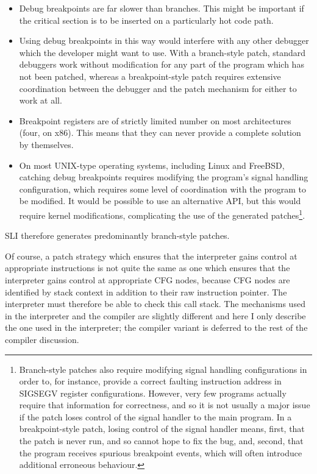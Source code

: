 \begin{itemize}
\item
  Debug breakpoints are far slower than branches.  This might be
  important if the critical section is to be inserted on a
  particularly hot code path.
\item
  Using debug breakpoints in this way would interfere with any other
  debugger which the developer might want to use.  With a branch-style
  patch, standard debuggers work without modification for any part of
  the program which has not been patched, whereas a breakpoint-style
  patch requires extensive coordination between the debugger and the
  patch mechanism for either to work at all.
\item
  Breakpoint registers are of strictly limited number on most
  architectures (four, on x86).  This means that they can never
  provide a complete solution by themselves.
\item
  On most UNIX-type operating systems, including Linux and FreeBSD,
  catching debug breakpoints requires modifying the program's signal
  handling configuration, which requires some level of coordination
  with the program to be modified.  It would be possible to use an
  alternative API, but this would require kernel modifications,
  complicating the use of the generated patches\footnote{Branch-style
    patches also require modifying signal handling configurations in
    order to, for instance, provide a correct faulting instruction
    address in SIGSEGV register configurations.  However, very few
    programs actually require that information for correctness, and so
    it is not usually a major issue if the patch loses control of the
    signal handler to the main program.  In a breakpoint-style patch,
    losing control of the signal handler means, first, that the patch
    is never run, and so cannot hope to fix the bug, and, second, that
    the program receives spurious breakpoint events, which will often
    introduce additional erroneous behaviour.}.
\end{itemize}

SLI therefore generates predominantly branch-style patches.


Of course, a patch strategy which ensures that the interpreter gains
control at appropriate instructions is not quite the same as one which
ensures that the interpreter gains control at appropriate CFG nodes,
because {\technique} CFG nodes are identified by stack context in
addition to their raw instruction pointer.  The interpreter must
therefore be able to check this call stack.  The mechanisms used in
the interpreter and the compiler are slightly different and here I
only describe the one used in the interpreter; the compiler variant is
deferred to the rest of the compiler discussion.

